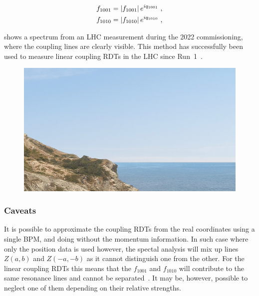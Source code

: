 \begin{equation}
  \begin{aligned}
    f_{1001} &= \left\lvert f_{1001} \right\rvert e^{i q_{1001}}  \text{ ,}  \\
    f_{1010} &= \left\lvert f_{1010} \right\rvert e^{i q_{1010}}  \text{ ,}  \\
  \end{aligned}
  \label{equation:complex_coupling_rdts_from_phase_and_amplitude}
\end{equation}

 shows a spectrum from an LHC measurement during the \num{2022} commissioning, where the coupling lines are clearly visible.
This method has successfully been used to measure linear coupling RDTs in the LHC since Run~\num{1}~\cite{PRAB:Benedikt:Driving_Term_Experiments_CERN,IPAC:Persson:Automatic_Coupling_Correction_LHC_Injection_Oscillations,IPAC:Miyamoto:Measurement_Coupling_RDTs_LHC_AC_Dipole}.

\begin{figure}[!h]
  \centering
  \includegraphics*[width=0.9\linewidth]{Figures/placeholder.png}
  \caption{}
  \label{figure:measurement_spectrum}
\end{figure}

\subsubsection*{Caveats}

It is possible to approximate the coupling RDTs from the real coordinates using a single BPM, and doing without the momentum information.
In such case where only the position data is used however, the spectal analysis will mix up lines \(Z(a,b)\) and \(Z(-a, -b)\) as it cannot distinguish one from the other.
For the linear coupling RDTs this means that the \(f_{1001}\) and \(f_{1010}\) will contribute to the same resonance lines and cannot be separated~\cite{PHD:Persson}.
It may be, however, possible to neglect one of them depending on their relative strengths.

